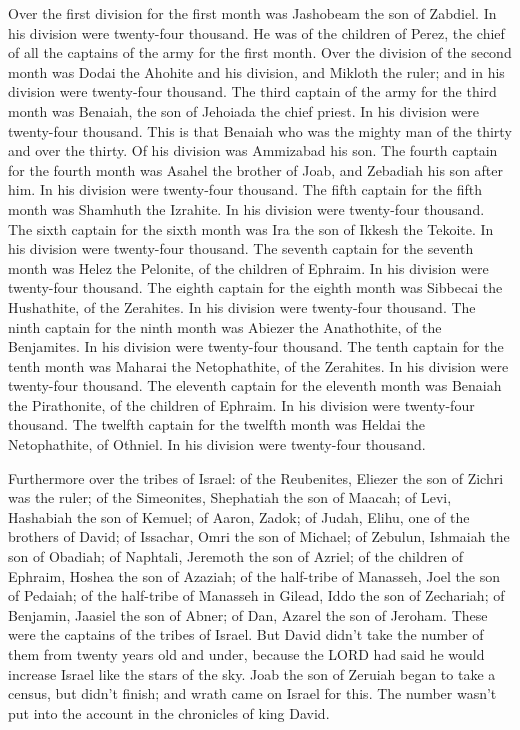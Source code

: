  Over the first division for the first month was Jashobeam
the son of Zabdiel. In his division were twenty-four thousand.
 He was of the children of Perez, the chief of all the
captains of the army for the first month.  Over the
division of the second month was Dodai the Ahohite and his division, and
Mikloth the ruler; and in his division were twenty-four thousand.
 The third captain of the army for the third month was
Benaiah, the son of Jehoiada the chief priest. In his division were
twenty-four thousand.  This is that Benaiah who was the
mighty man of the thirty and over the thirty. Of his division was
Ammizabad his son.  The fourth captain for the fourth
month was Asahel the brother of Joab, and Zebadiah his son after him. In
his division were twenty-four thousand.  The fifth captain
for the fifth month was Shamhuth the Izrahite. In his division were
twenty-four thousand.  The sixth captain for the sixth
month was Ira the son of Ikkesh the Tekoite. In his division were
twenty-four thousand.  The seventh captain for the
seventh month was Helez the Pelonite, of the children of Ephraim. In his
division were twenty-four thousand.  The eighth captain
for the eighth month was Sibbecai the Hushathite, of the Zerahites. In
his division were twenty-four thousand.  The ninth
captain for the ninth month was Abiezer the Anathothite, of the
Benjamites. In his division were twenty-four thousand. 
The tenth captain for the tenth month was Maharai the Netophathite, of
the Zerahites. In his division were twenty-four thousand.
 The eleventh captain for the eleventh month was Benaiah
the Pirathonite, of the children of Ephraim. In his division were
twenty-four thousand.  The twelfth captain for the
twelfth month was Heldai the Netophathite, of Othniel. In his division
were twenty-four thousand.

 Furthermore over the tribes of Israel: of the
Reubenites, Eliezer the son of Zichri was the ruler; of the Simeonites,
Shephatiah the son of Maacah;  of Levi, Hashabiah the son
of Kemuel; of Aaron, Zadok;  of Judah, Elihu, one of the
brothers of David; of Issachar, Omri the son of Michael; 
of Zebulun, Ishmaiah the son of Obadiah; of Naphtali, Jeremoth the son
of Azriel;  of the children of Ephraim, Hoshea the son of
Azaziah; of the half-tribe of Manasseh, Joel the son of Pedaiah;
 of the half-tribe of Manasseh in Gilead, Iddo the son of
Zechariah; of Benjamin, Jaasiel the son of Abner;  of
Dan, Azarel the son of Jeroham. These were the captains of the tribes of
Israel.  But David didn't take the number of them from
twenty years old and under, because the LORD had said he would increase
Israel like the stars of the sky.  Joab the son of
Zeruiah began to take a census, but didn't finish; and wrath came on
Israel for this. The number wasn't put into the account in the
chronicles of king David.

